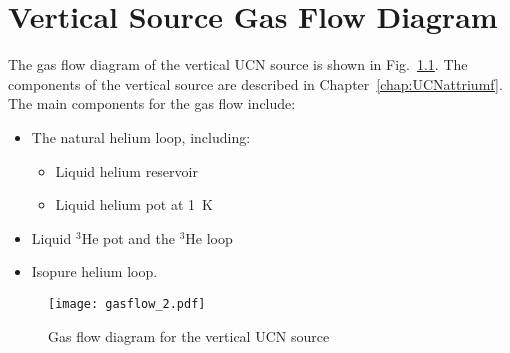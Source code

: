 \chapter{ Vertical Source Gas Flow Diagram\label{app:gasflow}}
The gas flow diagram of the vertical UCN source is shown in
Fig.~\ref{fig:gasflow}. The components of the vertical source are
described in Chapter~\ref{chap:UCNattriumf}. The main components for
the gas flow include:
\begin{itemize}
  \item The natural helium loop, including:
\begin{itemize}
\item Liquid helium reservoir
\item Liquid helium pot at 1~K
\end{itemize}
\item Liquid $^3$He pot and the $^3$He loop
\item Isopure helium loop.
\end{itemize}
\begin{figure}[h]
  \centering
    \texttt{[image: gasflow\_2.pdf]}
    \caption{ Gas flow diagram for the vertical UCN source }
    \label{fig:gasflow}
\end{figure}
